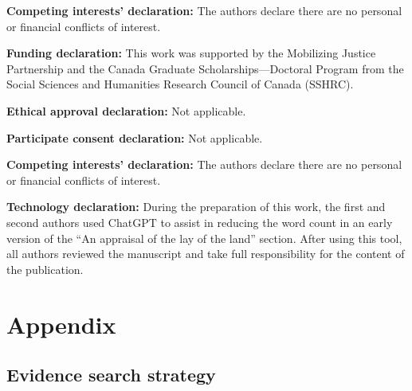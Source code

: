\documentclass[
  letterpaper,
  DIV=11,
  numbers=noendperiod]{scrartcl}
\begin{document}
\textbf{Competing interests' declaration:} The authors declare there are
no personal or financial conflicts of interest.

\textbf{Funding declaration:} This work was supported by the Mobilizing
Justice Partnership and the Canada Graduate Scholarships---Doctoral
Program from the Social Sciences and Humanities Research Council of
Canada (SSHRC).

\textbf{Ethical approval declaration:} Not applicable.

\textbf{Participate consent declaration:} Not applicable.

\textbf{Competing interests' declaration:} The authors declare there are
no personal or financial conflicts of interest.

\textbf{Technology declaration:} During the preparation of this work,
the first and second authors used ChatGPT to assist in reducing the word
count in an early version of the ``An appraisal of the lay of the land''
section. After using this tool, all authors reviewed the manuscript and
take full responsibility for the content of the publication.

\section{Appendix}\label{sec-sect6}

\subsection{Evidence search strategy}\label{sec-sect61}
\end{document}
